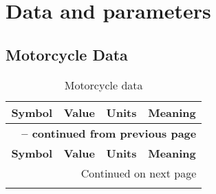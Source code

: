 \appendix
\chapter{Data and parameters}
%
\section{Motorcycle Data}
%    
\begin{longtable}{clcl}
    \caption{Motorcycle data} \label{tab:MotoData} \\
    \hline \multicolumn{1}{c}{\textbf{Symbol}} & \multicolumn{1}{c}{\textbf{Value}} & \multicolumn{1}{c}{\textbf{Units}} & \multicolumn{1}{c}{\textbf{Meaning}} \\ \hline
    \endfirsthead

    \multicolumn{4}{c}{{\bfseries \tablename\ \thetable{} -- continued from previous page}} \\
    \hline \multicolumn{1}{c}{\textbf{Symbol}} & \multicolumn{1}{c}{\textbf{Value}} & \multicolumn{1}{c}{\textbf{Units}} & \multicolumn{1}{c}{\textbf{Meaning}} \\ \hline
    \endhead

    \hline \multicolumn{4}{r}{{Continued on next page}} \\ \hline
    \endfoot


\end{longtable}
